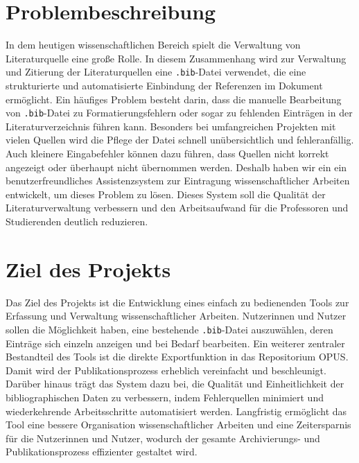 \section{Problembeschreibung}
In dem  heutigen wissenschaftlichen Bereich spielt die Verwaltung von Literaturquelle eine große Rolle.
In diesem Zusammenhang wird zur Verwaltung und Zitierung der Literaturquellen eine \texttt{.bib}-Datei verwendet,
die eine strukturierte und automatisierte Einbindung der Referenzen im Dokument ermöglicht.
Ein häufiges Problem besteht darin, dass die manuelle Bearbeitung von \texttt{.bib}-Datei zu 
Formatierungsfehlern oder sogar zu fehlenden Einträgen in der Literaturverzeichnis führen kann.
Besonders bei umfangreichen Projekten mit vielen Quellen wird die Pflege der Datei schnell unübersichtlich und fehleranfällig.
Auch kleinere Eingabefehler können dazu führen, dass Quellen nicht korrekt angezeigt oder überhaupt nicht übernommen werden.
Deshalb haben wir ein ein benutzerfreundliches Assistenzsystem zur Eintragung wissenschaftlicher Arbeiten entwickelt, um dieses Problem zu lösen.
Dieses System soll die Qualität der Literaturverwaltung verbessern und den Arbeitsaufwand für die Professoren und 
Studierenden deutlich reduzieren.


\section{Ziel des Projekts}
Das Ziel des Projekts ist die Entwicklung eines einfach zu bedienenden 
Tools zur Erfassung und Verwaltung wissenschaftlicher Arbeiten. 
Nutzerinnen und Nutzer sollen die Möglichkeit haben, eine bestehende 
\texttt{.bib}-Datei auszuwählen, deren Einträge sich einzeln anzeigen und bei 
Bedarf bearbeiten. Ein weiterer zentraler Bestandteil des Tools ist die direkte Exportfunktion
in das Repositorium OPUS. Damit wird der Publikationsprozess erheblich 
vereinfacht und beschleunigt. Darüber hinaus trägt das System dazu bei, 
die Qualität und Einheitlichkeit der bibliographischen Daten zu verbessern,
indem Fehlerquellen minimiert und wiederkehrende Arbeitsschritte 
automatisiert werden. Langfristig ermöglicht das Tool eine bessere Organisation 
wissenschaftlicher Arbeiten und eine Zeitersparnis für die 
Nutzerinnen und Nutzer, wodurch der gesamte Archivierungs- und 
Publikationsprozess effizienter gestaltet wird.

